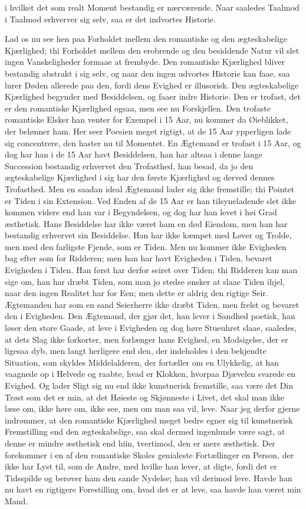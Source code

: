 \documentclass[12pt,a4paper]{article}
\begin{document}
i hvilket det som realt Moment bestandig er nærværende. Naar saaledes Taalmod i Taalmod erhverver sig selv, saa er det indvortes Historie.

Lad os nu see hen paa Forholdet mellem den romantiske og den ægteskabelige Kjærlighed; thi Forholdet mellem den erobrende og den besiddende Natur vil slet ingen Vanskeligheder formaae at frembyde. Den romantiske Kjærlighed bliver bestandig abstrakt i sig selv, og naar den ingen udvortes Historie kan faae, saa lurer Døden allerede paa den, fordi dens Evighed er illusorisk. Den ægteskabelige Kjærlighed begynder med Besiddelsen, og faaer indre Historie. Den er trofast, det er den romantiske Kjærlighed ogsaa, men see nu Forskjellen. Den trofaste romantiske Elsker han venter for Exempel i 15 Aar, nu kommer da Øieblikket, der belønner ham. Her seer Poesien meget rigtigt, at de 15 Aar ypperligen lade sig concentrere, den haster nu til Momentet. En Ægtemand er trofast i 15 Aar, og dog har han i de 15 Aar havt Besiddelsen, han har altsaa i denne lange Succession bestandig erhvervet den Trofasthed, han besad, da jo den ægteskabelige Kjærlighed i sig har den første Kjærlighed og derved dennes Trofasthed. Men en saadan ideal Ægtemand lader sig ikke fremstille; thi Pointet er Tiden i sin Extension. Ved Enden af de 15 Aar er han tilsyneladende slet ikke kommen videre end han var i Begyndelsen, og dog har han levet i høi Grad æsthetisk. Hans Besiddelse har ikke været ham en død Eiendom, men han har bestandig erhvervet sin Besiddelse. Han har ikke kæmpet med Løver og Trolde, men med den farligste Fjende, som er Tiden. Men nu kommer ikke Evigheden bag efter som for Ridderen; men han har havt Evigheden i Tiden, bevaret Evigheden i Tiden. Han først har derfor seiret over Tiden; thi Ridderen kan man sige om, han har dræbt Tiden, som man jo stedse ønsker at slaae Tiden ihjel, naar den ingen Realitet har for Een; men dette er aldrig den rigtige Seir. Ægtemanden har som en sand Seierherre ikke dræbt Tiden, men frelst og bevaret den i Evigheden. Den Ægtemand, der gjør det, han lever i Sandhed poetisk, han løser den store Gaade, at leve i Evigheden og dog høre Stueuhret slaae, saaledes, at dets Slag ikke forkorter, men forlænger hans Evighed, en Modsigelse, der er ligesaa dyb, men langt herligere end den, der indeholdes i den bekjendte Situation, som skyldes Middelalderen, der fortæller om en Ulykkelig, at han vaagnede op i Helvede og raabte, hvad er Klokken, hvorpaa Djævelen svarede en Evighed. Og lader Sligt sig nu end ikke kunstnerisk fremstille, saa være det Din Trøst som det er min, at det Høieste og Skjønneste i Livet, det skal man ikke læse om, ikke høre om, ikke see, men om man saa vil, leve. Naar jeg derfor gjerne indrømmer, at den romantiske Kjærlighed meget bedre egner sig til kunstnerisk Fremstilling end den ægteskabelige, saa skal dermed ingenlunde være sagt, at denne er mindre æsthetisk end hiin, tvertimod, den er mere æsthetisk. Der forekommer i en af den romantiske Skoles genialeste Fortællinger en Person, der ikke har Lyst til, som de Andre, med hvilke han lever, at digte, fordi det er Tidsspilde og berøver ham den sande Nydelse; han vil derimod leve. Havde han nu havt en rigtigere Forestilling om, hvad det er at leve, saa havde han været min Mand.
\end{document}
